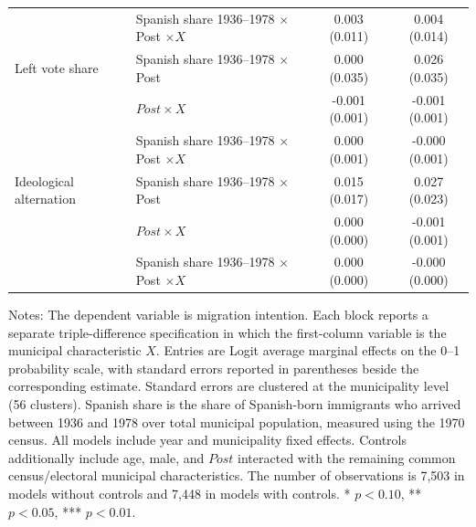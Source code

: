 \begin{table}[!htbp]
\begin{tabular}{llcc}
 & Spanish share 1936--1978 \(\times\) Post \(\times X\) & 0.003 (0.011) & 0.004 (0.014) \\
\addlinespace
Left vote share & Spanish share 1936--1978 \(\times\) Post & 0.000 (0.035) & 0.026 (0.035) \\
 & \(Post \times X\) & -0.001 (0.001) & -0.001 (0.001) \\
 & Spanish share 1936--1978 \(\times\) Post \(\times X\) & 0.000 (0.001) & -0.000 (0.001) \\
\addlinespace
Ideological alternation & Spanish share 1936--1978 \(\times\) Post & 0.015 (0.017) & 0.027 (0.023) \\
 & \(Post \times X\) & 0.000 (0.000) & -0.001 (0.001) \\
 & Spanish share 1936--1978 \(\times\) Post \(\times X\) & 0.000 (0.000) & -0.000 (0.000) \\
\hline
\end{tabular}
\par\vspace{1.5mm}
\begin{minipage}{0.98\linewidth}
\footnotesize\setlength{\parindent}{0pt}\setlength{\parskip}{1pt}
Notes: The dependent variable is migration intention. Each block reports a separate triple-difference specification in which the first-column variable is the municipal characteristic \(X\). Entries are Logit average marginal effects on the 0--1 probability scale, with standard errors reported in parentheses beside the corresponding estimate. Standard errors are clustered at the municipality level (56 clusters). Spanish share is the share of Spanish-born immigrants who arrived between 1936 and 1978 over total municipal population, measured using the 1970 census. All models include year and municipality fixed effects. Controls additionally include age, male, and \(Post\) interacted with the remaining common census/electoral municipal characteristics. The number of observations is        7,503 in models without controls and        7,448 in models with controls. * \(p<0.10\), ** \(p<0.05\), *** \(p<0.01\).
\end{minipage}
\end{table}
